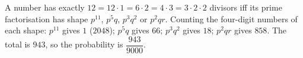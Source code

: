 A number has exactly $12=12\cdot1=6\cdot2=4\cdot3=3\cdot2\cdot2$ divisors iff its prime factorisation has shape $p^{11}$, $p^5q$, $p^3q^2$ or $p^2qr$. Counting the four-digit numbers of each shape: $p^{11}$ gives $1$ ($2048$); $p^5q$ gives $66$; $p^3q^2$ gives $18$; $p^2qr$ gives $858$. The total is $943$, so the probability is $\boxed{\dfrac{943}{9000}}$.
